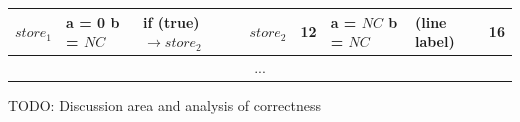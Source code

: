 \begin{table}[htcb]
\begin{tabular}{| p{} | p{} | p{} | p{} | p{} | p{} | p{} | p{} |}
			\hline
			$store_1$			&	a = 0 \newline b = $NC$		&	if (true) $\rightarrow store_2$ & $store_2$			&	12					&	a = $NC$ \newline b = $NC$	&	(line label)				&	16	\\
			\hline
			\multicolumn{8}{|c|}{...}\\
			\hline
		\end{tabular}
	\label{table:StoreExecCombined}
\end{table}

TODO: Discussion area and analysis of correctness
